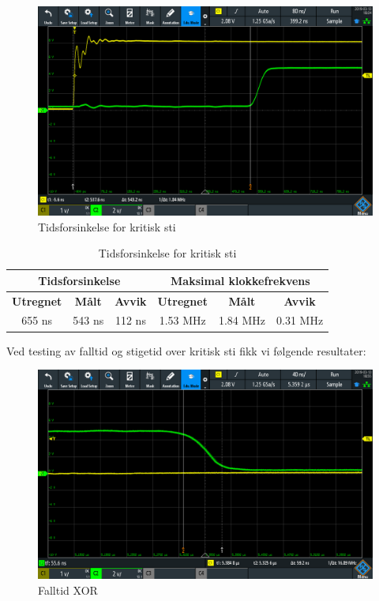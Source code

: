 \begin{figure}
  \centering
  \caption{Tidsforsinkelse for kritisk sti}
  \label{tidsforsinkelse}
  \includegraphics[width=14cm]{Bilder/fosinkelse.png}
\end{figure}

\begin{table}[!htb]
  \centering
  \caption{Tidsforsinkelse for kritisk sti}
  \label{figure:tidsforsinkelse}
  \begin{tabular}{c c c|c c c}
    \multicolumn{3}{c|}{\textbf{Tidsforsinkelse}} & \multicolumn{3}{c}{\textbf{Maksimal klokkefrekvens}} \\ \hline
    \textbf{Utregnet} & \textbf{Målt} & \textbf{Avvik} & \textbf{Utregnet} & \textbf{Målt} & \textbf{Avvik} \\ \hline
    655 ns & 543 ns & 112 ns & 1.53 MHz & 1.84 MHz & 0.31 MHz\\
  \end{tabular}
\end{table}

Ved testing av falltid og stigetid over kritisk sti fikk vi følgende resultater:

\begin{figure}
  \centering
  \caption{Falltid XOR}
  \includegraphics[width=14cm]{Bilder/Fall.png}
\end{figure}

